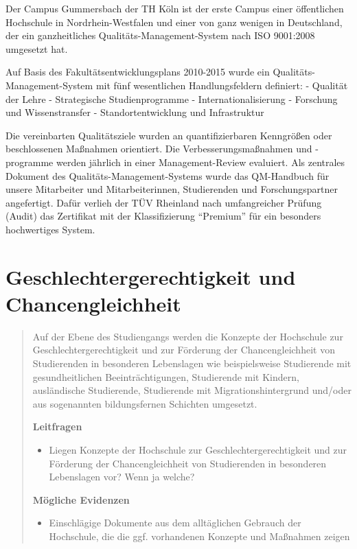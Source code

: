 Der Campus Gummersbach der TH Köln ist der erste Campus einer
öffentlichen Hochschule in Nordrhein-Westfalen und einer von ganz
wenigen in Deutschland, der ein ganzheitliches
Qualitäts-Management-System nach ISO 9001:2008 umgesetzt hat.

Auf Basis des Fakultätsentwicklungsplans 2010-2015 wurde ein
Qualitäts-Management-System mit fünf wesentlichen Handlungsfeldern
definiert: - Qualität der Lehre - Strategische Studienprogramme -
Internationalisierung - Forschung und Wissenstransfer -
Standortentwicklung und Infrastruktur

Die vereinbarten Qualitätsziele wurden an quantifizierbaren Kenngrößen
oder beschlossenen Maßnahmen orientiert. Die Verbesserungsmaßnahmen und
-programme werden jährlich in einer Management-Review evaluiert. Als
zentrales Dokument des Qualitäts-Management-Systems wurde das
QM-Handbuch für unsere Mitarbeiter und Mitarbeiterinnen, Studierenden
und Forschungspartner angefertigt. Dafür verlieh der TÜV Rheinland nach
umfangreicher Prüfung (Audit) das Zertifikat mit der Klassifizierung
``Premium'' für ein besonders hochwertiges System.

\chapter{Geschlechtergerechtigkeit und
Chancengleichheit}\label{geschlechtergerechtigkeit-und-chancengleichheit}

\begin{quote}
Auf der Ebene des Studiengangs werden die Konzepte der Hochschule zur
Geschlechtergerechtigkeit und zur Förderung der Chancengleichheit von
Studierenden in besonderen Lebenslagen wie beispielsweise Studierende
mit gesundheitlichen Beeinträchtigungen, Studierende mit Kindern,
ausländische Studierende, Studierende mit Migrationshintergrund und/oder
aus sogenannten bildungsfernen Schichten umgesetzt.

\textbf{Leitfragen}

\begin{itemize}
\tightlist
\item
  Liegen Konzepte der Hochschule zur Geschlechtergerechtigkeit und zur
  Förderung der Chancengleichheit von Studierenden in besonderen
  Lebenslagen vor? Wenn ja welche?
\end{itemize}

\textbf{Mögliche Evidenzen}

\begin{itemize}
\tightlist
\item
  Einschlägige Dokumente aus dem alltäglichen Gebrauch der Hochschule,
  die die ggf. vorhandenen Konzepte und Maßnahmen zeigen
\end{itemize}
\end{quote}

